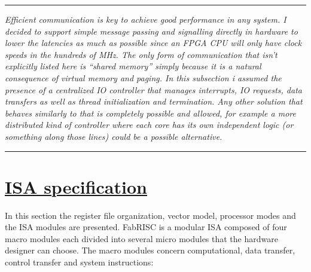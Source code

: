 \documentclass{article}
\begin{document}
        \par\noindent\rule{\textwidth}{0.4pt}
        \textit{Efficient communication is key to achieve good performance in any system. I decided to support simple message passing and signalling directly in hardware to lower the latencies as much as possible since an FPGA CPU will only have clock speeds in the hundreds of MHz. The only form of communication that isn't explicitly listed here is ``shared memory'' simply because it is a natural consequence of virtual memory and paging. In this subsection i assumed the presence of a centralized IO controller that manages interrupts, IO requests, data transfers as well as thread initialization and termination. Any other solution that behaves similarly to that is completely possible and allowed, for example a more distributed kind of controller where each core has its own independent logic (or something along those lines) could be a possible alternative.}
        \par\noindent\rule{\textwidth}{0.4pt}

    \clearpage

    \section[ISA specification]{\LARGE\underline{ISA specification}} %

        In this section the register file organization, vector model, processor modes and the ISA modules are presented. FabRISC is a modular ISA composed of four macro modules each divided into several micro modules that the hardware designer can choose. The macro modules concern computational, data transfer, control transfer and system instructions:
\end{document}
